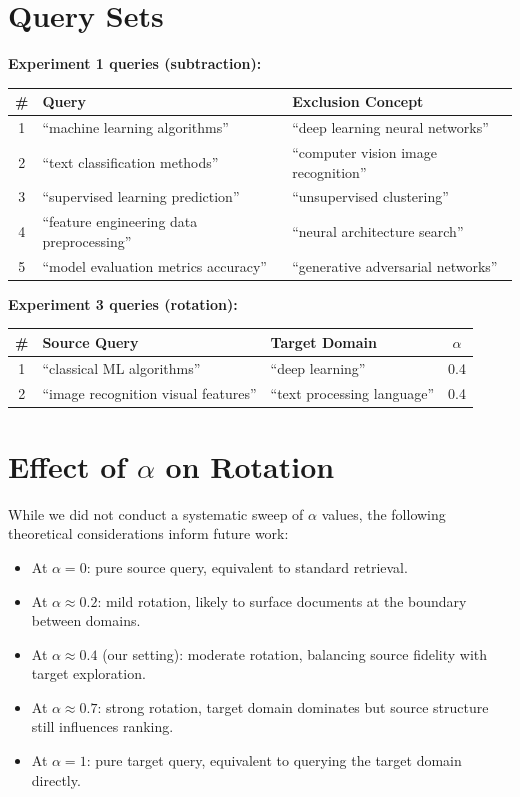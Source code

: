 \documentclass{article}
\begin{document}
\section{Query Sets}

\textbf{Experiment 1 queries (subtraction):}

\begin{table}[h]
\centering
\begin{tabular}{cll}
\toprule
\# & Query & Exclusion Concept \\
\midrule
1 & ``machine learning algorithms'' & ``deep learning neural networks'' \\
2 & ``text classification methods'' & ``computer vision image recognition'' \\
3 & ``supervised learning prediction'' & ``unsupervised clustering'' \\
4 & ``feature engineering data preprocessing'' & ``neural architecture search'' \\
5 & ``model evaluation metrics accuracy'' & ``generative adversarial networks'' \\
\bottomrule
\end{tabular}
\end{table}

\textbf{Experiment 3 queries (rotation):}

\begin{table}[h]
\centering
\begin{tabular}{cllc}
\toprule
\# & Source Query & Target Domain & $\alpha$ \\
\midrule
1 & ``classical ML algorithms'' & ``deep learning'' & 0.4 \\
2 & ``image recognition visual features'' & ``text processing language'' & 0.4 \\
\bottomrule
\end{tabular}
\end{table}

\section{Effect of $\alpha$ on Rotation}

While we did not conduct a systematic sweep of $\alpha$ values, the following theoretical considerations inform future work:

\begin{itemize}
\item At $\alpha = 0$: pure source query, equivalent to standard retrieval.
\item At $\alpha \approx 0.2$: mild rotation, likely to surface documents at the boundary between domains.
\item At $\alpha \approx 0.4$ (our setting): moderate rotation, balancing source fidelity with target exploration.
\item At $\alpha \approx 0.7$: strong rotation, target domain dominates but source structure still influences ranking.
\item At $\alpha = 1$: pure target query, equivalent to querying the target domain directly.
\end{itemize}
\end{document}

